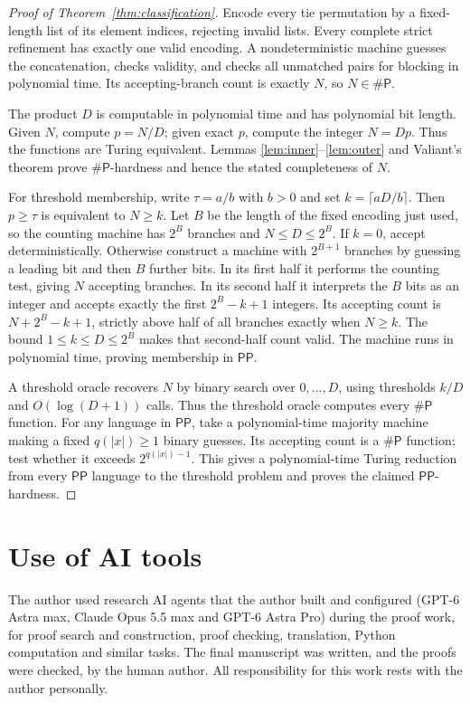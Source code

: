 \documentclass[11pt]{article}
\newcommand{\PP}{\mathsf{PP}}
\newcommand{\sharpP}{\mathsf{\#P}}
\begin{document}
\begin{proof}[Proof of Theorem~\ref{thm:classification}]
Encode every tie permutation by a fixed-length list of its element
indices, rejecting invalid lists. Every complete strict refinement has
exactly one valid encoding. A nondeterministic machine guesses the
concatenation, checks validity, and checks all unmatched pairs for
blocking in polynomial time. Its accepting-branch count is exactly $N$,
so $N\in\sharpP$.

The product $D$ is computable in polynomial time and has polynomial
bit length. Given $N$, compute $p=N/D$; given exact $p$, compute the
integer $N=Dp$. Thus the functions are Turing equivalent. Lemmas
\ref{lem:inner}--\ref{lem:outer} and Valiant's theorem prove
$\sharpP$-hardness and hence the stated completeness of $N$.

For threshold membership, write $\tau=a/b$ with $b>0$ and set
$k=\lceil aD/b\rceil$. Then $p\geq\tau$ is equivalent to $N\geq k$.
Let $B$ be the length of the fixed encoding just used, so the counting
machine has $2^B$ branches and $N\leq D\leq2^B$.
If $k=0$, accept deterministically.
Otherwise construct a machine with $2^{B+1}$ branches by guessing a
leading bit and then $B$ further bits. In its first half it performs the
counting test, giving $N$ accepting branches.
In its second half it interprets the $B$ bits as an integer and accepts
exactly the first $2^B-k+1$ integers. Its accepting count is
$N+2^B-k+1$, strictly above half of all branches exactly when $N\geq k$.
The bound $1\leq k\leq D\leq2^B$ makes that second-half count valid.
The machine runs in polynomial time, proving membership in $\PP$.

A threshold oracle recovers $N$ by binary search over $0,\ldots,D$,
using thresholds $k/D$ and $O(\log(D+1))$ calls.
Thus the threshold oracle computes every $\sharpP$ function.
For any language in $\PP$, take a polynomial-time majority machine
making a fixed $q(|x|)\geq1$ binary guesses.
Its accepting count is a $\sharpP$ function; test whether it exceeds
$2^{q(|x|)-1}$. This gives a polynomial-time Turing
reduction from every $\PP$ language to the threshold problem and proves
the claimed $\PP$-hardness.
\end{proof}

\section*{Use of AI tools}
The author used research AI agents that the author built and configured (GPT-6 Astra max,
Claude Opus 5.5 max and GPT-6 Astra Pro) during the proof work, for proof search and
construction, proof checking, translation, Python computation and similar tasks. The final
manuscript was written, and the proofs were checked, by the human author. All responsibility
for this work rests with the author personally.
\end{document}
